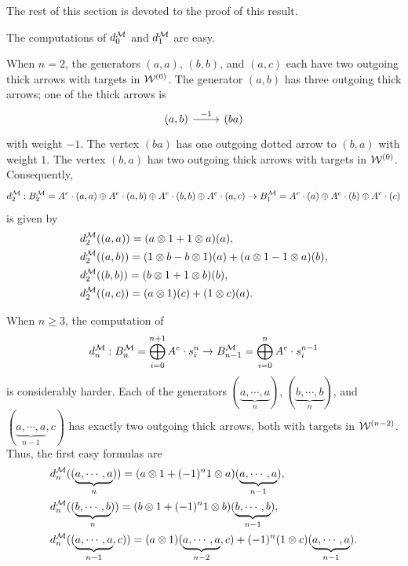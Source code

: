 \documentclass[10pt, reqno]{amsart}
\theoremstyle{definition}
\theoremstyle{remark}
\numberwithin{equation}{section}
\begin{document}
The rest of this section is devoted to the proof of this result. 

The computations of $d_0^{\mathcal{M}}$ and $d_1^{\mathcal{M}}$ are easy. 

 

When \(n=2\), the generators $(a,a)$, $(b,b)$, and $(a,c)$ each have two outgoing thick arrows with targets in $\mathcal{W}^{(0)}$. 
The generator $(a,b)$ has three outgoing thick arrows; one of the thick arrows is
\[
\begin{tikzcd}
 (a,b) \arrow[r,"-1"]  & (ba) 
\end{tikzcd}
\]
with weight $-1$. The vertex $(ba)$ has one outgoing dotted arrow to $(b,a)$ with weight $1$. The vertex $(b,a)$ has two outgoing thick arrows with targets in $\mathcal{W}^{(0)}$. Consequently, 
$$d_2^{\mathcal{M}}: B_2^{\mathcal{M}}=A^e \cdot (a, a)\oplus A^e \cdot (a, b)\oplus A^e \cdot (b, b)\oplus  A^e \cdot (a, c)\to B_1^{\mathcal{M}}=A^e \cdot (a)\oplus A^e \cdot (b)\oplus A^e \cdot (c)$$
is given by
\[ \begin{aligned}
    &d_2^{\mathcal{M}}((a,a))= (a \otimes 1 + 1\otimes a)  (a),\\
    &d_2^{\mathcal{M}}((a,b))= (1\otimes b-b \otimes 1 ) (a) + (a \otimes 1 - 1 \otimes a) (b), \\
    &d_2^{\mathcal{M}}((b,b))= (b \otimes 1+ 1\otimes b) (b), \\
    &d_2^{\mathcal{M}}((a,c))= (a \otimes 1) (c) + (1\otimes c)  (a).
\end{aligned}\]


When \(n\ge 3\), the computation of 
$$d_n^{\mathcal{M}}: B_n^{\mathcal{M}}  = \bigoplus_{i=0}^{n+1} A^e \cdot s_i^n \to  B_{n-1}^{\mathcal{M}}  = \bigoplus_{i=0}^{n} A^e \cdot s_i^{n-1} $$ is considerably harder. Each of the generators \((\underbrace{a, \cdots,a}_{n})\), \((\underbrace{b, \cdots, b}_{n})\), and \((\underbrace{a, \cdots,a}_{n-1},c)\) has exactly two outgoing thick arrows, both with targets in \(\mathcal{W}^{(n-2)}\). Thus, the first easy formulas are 
\[ \begin{aligned}
    &d_n^{\mathcal{M}}((\underbrace{a, \cdots,a}_{n}))= (a \otimes 1 + (-1)^n1\otimes a)  (\underbrace{a, \cdots,a}_{n-1}),\\
    &d_n^{\mathcal{M}}((\underbrace{b, \cdots, b}_{n}))= (b \otimes 1+ (-1)^n 1\otimes b)(\underbrace{b, \cdots, b}_{n-1}), \\
    &d_n^{\mathcal{M}}((\underbrace{a, \cdots,a}_{n-1},c))= (a \otimes 1) (\underbrace{a, \cdots,a}_{n-2},c) + (-1)^n (1\otimes c)  (\underbrace{a, \cdots,a}_{n-1}).
\end{aligned}\]
\end{document}
